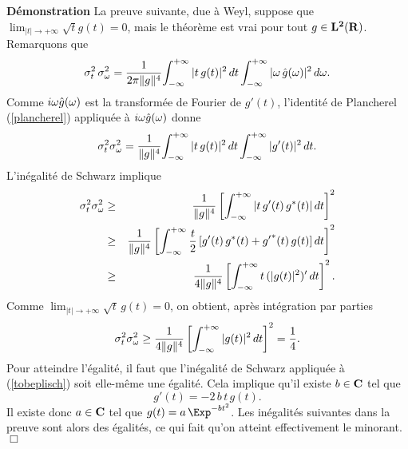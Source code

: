 {\bf D\'emonstration}
La preuve suivante, due \`{a} Weyl, suppose que
$\lim _{|t| \rightarrow + \infty} \sqrt t g(t) = 0$,
mais le th\'{e}or\`{e}me est vrai pour tout $g \in {\bf L ^ 2 ({\bf{R}})}$. 
Remarquons que
\begin{equation}
\sigma^2_t\, \sigma^2_{\omega} = \frac 1 {2 \pi \|g\|^4}
{\int_{- \infty}^{+ \infty} |t\, g(t)|^2\, dt} \,
{\int_{- \infty}^{+ \infty} |{\omega}\, \hat g( {\omega} )|^2 \,d{\omega}} .
\end{equation}
Comme $i	{\omega}	\hat g({\omega})$ est la transform\'{e}e de Fourier de $g'(t)$,
l'identit\'{e} de Plancherel (\ref{plancherel}) appliqu\'{e}e \`{a} 
$i	{\omega}	\hat g(	{\omega}	)$ donne
\begin{equation}
\label{tobeplisch}
\sigma^2_t \sigma^2_{\omega} = \frac 1 {\|g\|^4}
{\int_{- \infty}^{+ \infty} |t \,g(t)|^2 \,dt} \,
{\int_{- \infty}^{+ \infty} |g'( t )|^2\, dt} .
\end{equation}
L'in\'{e}galit\'{e} de Schwarz implique
\begin{eqnarray*}
\sigma^2_t \sigma^2_{\omega} & \geq & \frac 1 {\|g\|^4}
\left[ {\int_{- \infty}^{+ \infty} |t\, g'(t) \,g^* (t)|\, dt} \right]^2\\
& \geq & \frac 1 {\|g\|^4} \left[
{\int_{- \infty}^{+ \infty} \frac t 2\, [ g'(t)\, g^* (t) 
+ {g'}^*(t)\, g(t)]\, dt}
\right]^2\\  
&\geq &\frac 1 { 4 \|g\|^4}
\left[ {\int_{- \infty}^{+ \infty} t \,(|g(t)|^2)'\, dt} \right]^2 .
\end{eqnarray*}
Comme
$\lim _{|t| \rightarrow + \infty} \sqrt t \,g(t) = 0$,
on obtient, apr\`{e}s int\'{e}gration par parties
\begin{equation}
\sigma^2_t \sigma^2_{\omega} \geq \frac 1 { 4 \|g\|^4}
\left[ {\int_{- \infty}^{+ \infty} |g(t)|^2 \,dt} \right]^2 
= \frac 1 4 .
\end{equation}
Pour atteindre l'\'{e}galit\'{e}, il faut que l'in\'{e}galit\'{e} de 
Schwarz appliqu\'{e}e \`{a} (\ref{tobeplisch}) soit elle-m\^{e}me une 
\'{e}galit\'{e}. Cela implique qu'il existe $b \in {\bf{C}}$ tel que
\begin{equation}
g'(t) = -2\,b\, t\, g(t) .
\end{equation}
Il existe donc $a \in {\bf{C}}$ tel que
$g(t) = a \,\Exp^{-b t^2}$.
Les in\'{e}galit\'{e}s suivantes dans la preuve sont alors des 
\'{e}galit\'{e}s, ce qui fait qu'on atteint effectivement le minorant.
$\Box$


